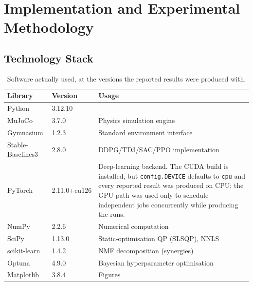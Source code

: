\chapter{Implementation and Experimental Methodology}
\label{chap:impl}

\section{Technology Stack}

\begin{table}[H]
  \centering
  \caption{Software actually used, at the versions the reported results were
           produced with.}
  \label{tab:stack}
  \small
  \setlength{\tabcolsep}{5pt}
  \begin{tabularx}{\textwidth}{@{} L{3.5cm} C{1.9cm} X @{}}
    \toprule
    \textbf{Library} & \textbf{Version} & \textbf{Usage} \\
    \midrule
    Python             & 3.12.10 & \\
    MuJoCo             & 3.7.0   & Physics simulation engine~\parencite{Todorov2012} \\
    Gymnasium          & 1.2.3   & Standard \RL{} environment interface \\
    Stable-Baselines3  & 2.8.0   & DDPG/TD3/SAC/PPO implementation~\parencite{Raffin2021} \\
    PyTorch            & 2.11.0+cu126 & Deep-learning backend. The CUDA build is installed, but \texttt{config.DEVICE} defaults to \texttt{cpu} and every reported result was produced on CPU; the GPU path was used only to schedule independent jobs concurrently while producing the runs. \\
    NumPy              & 2.2.6   & Numerical computation \\
    SciPy              & 1.13.0  & Static-optimisation QP (SLSQP), NNLS \\
    scikit-learn       & 1.4.2   & NMF decomposition (synergies) \\
    Optuna             & 4.9.0   & Bayesian hyperparameter optimisation~\parencite{Akiba2019} \\
    Matplotlib         & 3.8.4   & Figures \\
    \bottomrule
  \end{tabularx}
\end{table}

